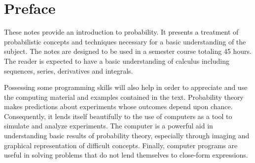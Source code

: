 \chapter*{Preface}

These notes provide an introduction to probability.
It presents a treatment of probabilistic concepts and techniques necessary for a basic understanding of the subject.
The notes are designed to be used in a semester course totaling 45 hours.
The reader is expected to have a basic understanding of calculus including sequences, series, derivatives and integrals.

Possessing some programming skills will also help in order to appreciate and use the computing material and examples contained in the text.
Probability theory makes predictions about experiments whose outcomes depend upon chance.
Consequently, it lends itself beautifully to the use of computers as a tool to simulate and analyze experiments.
The computer is a powerful aid in understanding basic results of probability theory, especially through imaging and graphical representation of difficult concepts.
Finally, computer programs are useful in solving problems that do not lend themselves to close-form expressions.

